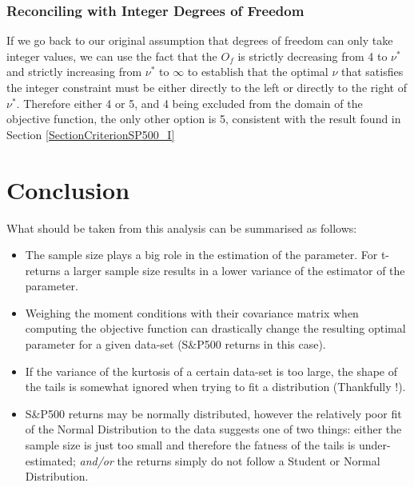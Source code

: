 \newpage

\subsection{Reconciling with Integer Degrees of Freedom}
If we go back to our original assumption that degrees of freedom can only take integer values, we can use the fact that the $O_f$ is strictly decreasing from 4 to $\nu^*$ and strictly increasing from $\nu^*$ to $\infty$ to establish that the optimal $\nu$ that satisfies the integer constraint must be either directly to the left or directly to the right of $\nu^*$. Therefore either 4 or 5, and 4 being excluded from the domain of the objective function, the only other option is 5, consistent with the result found in Section \ref{SectionCriterionSP500_I}

\chapter{Conclusion}

What should be taken from this analysis can be summarised as follows:
\begin{itemize}

\item The sample size plays a big role in the estimation of the parameter. For t-returns a larger sample size results in a lower variance of the estimator of the parameter.
\item Weighing the moment conditions with their covariance matrix when computing the objective function can drastically change the resulting optimal parameter for a given data-set (S\&P500 returns in this case).
\item If the variance of the kurtosis of a certain data-set is too large, the shape of the tails is somewhat ignored when trying to fit a distribution (Thankfully !).
\item S\&P500 returns may be normally distributed, however the relatively poor fit of the Normal Distribution to the data suggests one of two things: either the sample size is just too small and therefore the fatness of the tails is under-estimated; \emph{and/or} the returns simply do not follow a Student or Normal Distribution.

\end{itemize}
